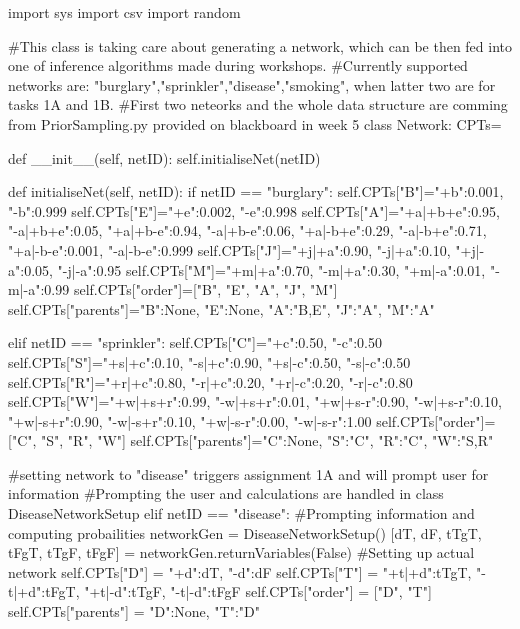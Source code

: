 \documentclass[10pt]{article}
\begin{document}
\begin{spverbatim}
import sys
import csv
import random

#This class is taking care about generating a network, which can be then fed into one of inference algorithms made during workshops. 
#Currently supported networks are: "burglary","sprinkler","disease","smoking", when latter two are for tasks 1A and 1B. 
#First two neteorks and the whole data structure are comming from PriorSampling.py provided on blackboard in week 5
class Network:
    CPTs={}

    def __init__(self, netID):
        self.initialiseNet(netID)		

    def initialiseNet(self, netID):
        if netID == "burglary":
            self.CPTs["B"]={"+b":0.001, "-b":0.999}
            self.CPTs["E"]={"+e":0.002, "-e":0.998}
            self.CPTs["A"]={"+a|+b+e":0.95, "-a|+b+e":0.05, 
					"+a|+b-e":0.94, "-a|+b-e":0.06,
					"+a|-b+e":0.29, "-a|-b+e":0.71,
					"+a|-b-e":0.001, "-a|-b-e":0.999}
            self.CPTs["J"]={"+j|+a":0.90, "-j|+a":0.10, 
					"+j|-a":0.05, "-j|-a":0.95}
            self.CPTs["M"]={"+m|+a":0.70, "-m|+a":0.30, 
					"+m|-a":0.01, "-m|-a":0.99}
            self.CPTs["order"]=["B", "E", "A", "J", "M"]
            self.CPTs["parents"]={"B":None, "E":None, "A":"B,E", "J":"A", "M":"A"}

        elif netID == "sprinkler":
            self.CPTs["C"]={"+c":0.50, "-c":0.50}
            self.CPTs["S"]={"+s|+c":0.10, "-s|+c":0.90, 
					"+s|-c":0.50, "-s|-c":0.50}
            self.CPTs["R"]={"+r|+c":0.80, "-r|+c":0.20, 
					"+r|-c":0.20, "-r|-c":0.80}
            self.CPTs["W"]={"+w|+s+r":0.99, "-w|+s+r":0.01, 
					"+w|+s-r":0.90, "-w|+s-r":0.10,
					"+w|-s+r":0.90, "-w|-s+r":0.10,
                    "+w|-s-r":0.00, "-w|-s-r":1.00}
            self.CPTs["order"]=["C", "S", "R", "W"]
            self.CPTs["parents"]={"C":None, "S":"C", "R":"C", "W":"S,R"}

        #setting network to "disease" triggers assignment 1A and will prompt user for information
        #Prompting the user and calculations are handled in class DiseaseNetworkSetup
        elif netID == "disease":
            #Prompting information and computing probailities
            networkGen = DiseaseNetworkSetup()
            [dT,  dF,  tTgT, tFgT, tTgF, tFgF] = networkGen.returnVariables(False)
            #Setting up actual network
            self.CPTs["D"] = {"+d":dT, "-d":dF}
            self.CPTs["T"] = {"+t|+d":tTgT, "-t|+d":tFgT, "+t|-d":tTgF,  "-t|-d":tFgF}
            self.CPTs["order"] = ["D",  "T"]
            self.CPTs["parents"] = {"D":None,  "T":"D"}
        

\end{spverbatim}
\end{document}
